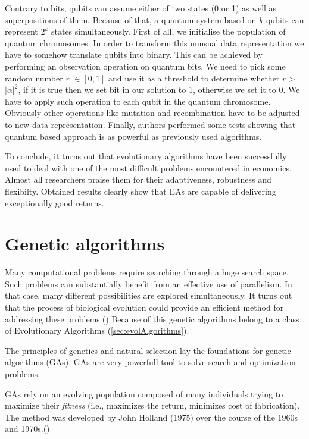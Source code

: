 Contrary to bits, qubits can assume either of two states (0 or 1) as well as superpositions of them.
Because of that, a quantum system based on $k$ qubits can represent $2^{k}$ states simultaneously.
First of all, we initialise the population of quantum chromosomes.
In order to transform this unusual data representation we have to somehow translate qubits into binary.
This can be achieved by performing an observation operation on quantum bits.
We need to pick some random number $r$ $\in [0,1]$ and use it as a threshold to determine whether $r$ > $|\alpha|^2$, if it is true then we set bit in our solution
 to 1, otherwise we set it to 0.
We have to apply such operation to each qubit in the quantum chromosome.
Obviously other operations like mutation and recombination have to be adjusted to new data representation.
Finally, authors performed some tests showing that quantum based approach is as powerful as previously used algorithms.
  

To conclude, it turns out that evolutionary algorithms have been successfully used to deal with one of the most difficult problems encountered in economics.
Almost all researchers praise them for their adaptiveness, robustness and flexibilty.
Obtained results clearly show that EAs are capable of delivering exceptionally good returns.      


\section{Genetic algorithms}
\label{sec:genAlgorithms}

Many computational problems require searching through a huge search space.
Such problems can substantially benefit from an effective use of parallelism.
In that case, many different possibilities are explored simultaneously. 
It turns out that the process of biological evolution could provide an efficient method for addressing these problems.(\cite{Mitchell01})
Because of this genetic algorithms belong to a class of Evolutionary Algorithms (\ref{sec:evolAlgorithms}).


The principles of genetics and natural selection lay the foundations for genetic algorithms (GAs).
GAs are very powerfull tool to solve search and optimization problems.

GAs rely on an evolving population composed of many individuals trying to maximize their \emph{fitness} (i.e., maximizes the return, minimizes cost of fabrication).  
The method was developed by John Holland (1975) over the course of the 1960s and 1970s.(\cite{Haupt:2004:PGA:1007746})

